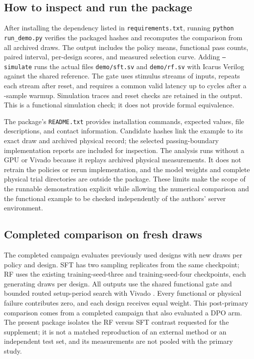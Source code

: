 \subsection{How to inspect and run the package}
After installing the dependency listed in \texttt{requirements.txt}, running
\texttt{python run\_demo.py} verifies the packaged hashes and recomputes the
comparison from all archived draws. The output includes the policy means,
functional pass counts, paired interval, per-design scores, and measured
selection curve. Adding \texttt{--simulate} runs the actual files
\texttt{demo/sft.sv} and \texttt{demo/rf.sv} with Icarus Verilog against the
shared reference. The gate uses  stimulus streams
of  inputs, repeats each stream after reset, and
requires a common valid latency up to  cycles
after a -sample warmup. Simulation traces and reset
checks are retained in the output. This is a functional simulation check;
it does not provide formal equivalence.

The package's \texttt{README.txt} provides installation commands, expected
values, file descriptions, and contact information. Candidate hashes link
the example to its exact draw and archived physical record; the selected
passing-boundary implementation reports are included for inspection. The
analysis runs without a GPU or Vivado because it replays archived physical
measurements. It does not retrain the policies or rerun implementation, and
the model weights and complete physical trial directories are outside the
package. These limits make the scope of the runnable demonstration explicit
while allowing the numerical comparison and the functional example to be
checked independently of the authors' server environment.

\subsection{Completed comparison on fresh draws}

The completed campaign evaluates  previously used
designs with  new draws per policy and design.
SFT has two sampling replicates from the same checkpoint; RF uses the existing
training-seed-three and training-seed-four checkpoints, each generating
 draws per design. All outputs use the shared
functional gate and bounded routed setup-period search with Vivado
. Every functional or physical failure contributes
zero, and each design receives equal weight. This post-primary comparison
comes from a completed campaign that also evaluated a DPO arm. The present
package isolates the RF versus SFT contrast requested for the supplement;
it is not a matched reproduction of an external method or an independent
test set, and its measurements are not pooled with the primary study.

